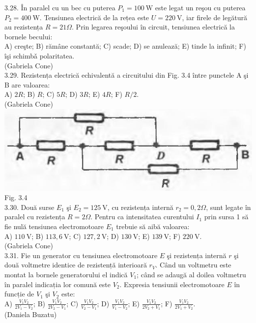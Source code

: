 \documentclass[10pt]{article}
\begin{document}
3.28. În paralel cu un bec cu puterea $P_{1}=100 \mathrm{~W}$ este legat un reşou cu puterea $P_{2}=400 \mathrm{~W}$. Tensiunea electrică de la rețea este $U=220 \mathrm{~V}$, iar firele de legătură au rezistența $R=21 \Omega$. Prin legarea reşoului în circuit, tensiunea electrică la bornele becului:\\ A) creşte; B) rămâne constantă; C) scade; D) se anulează; E) tinde la infinit; F) îşi schimbǎ polaritatea.\\ (Gabriela Cone)\\

3.29. Rezistența electrică echivalentă a circuitului din Fig. 3.4 între punctele A şi B are valoarea:\\ A) $2 R$; B) $R$; C) $5 R$; D) $3 R$; E) $4 R$; F) $R / 2$.\\ (Gabriela Cone)\\ \includegraphics[max width=\textwidth, center]{2025_07_01_5b3ff9fa0d508c8e9f17g-149} Fig. 3.4\\

3.30. Două surse $E_{1}$ şi $E_{2}=125 \mathrm{~V}$, cu rezistența internă $r_{2}=0,2 \Omega$, sunt legate în paralel cu rezistența $R=2 \Omega$. Pentru ca intensitatea curentului $I_{1}$ prin sursa 1 să fie nulă tensiunea electromotoare $E_{1}$ trebuie să aibă valoarea:\\ A) $110 \mathrm{~V}$; B) $113,6 \mathrm{~V}$; C) $127,2 \mathrm{~V}$; D) $130 \mathrm{~V}$; E) $139 \mathrm{~V}$; F) $220 \mathrm{~V}$.\\ (Gabriela Cone)\\

3.31. Fie un generator cu tensiunea electromotoare $E$ şi rezistența internă $r$ şi două voltmetre identice de rezistență interioară $r_{V}$. Când un voltmetru este montat la bornele generatorului el indică $V_{1}$; când se adaugă al doilea voltmetru în paralel indicația lor comună este $V_{2}$. Expresia tensiunii electromotoare $E$ în funcție de $V_{1}$ şi $V_{2}$ este:\\ A) $\frac{V_{1} V_{2}}{2 V_{1}-V_{2}}$; B) $\frac{V_{1} V_{2}}{2 V_{2}-V_{1}}$; C) $\frac{V_{1} V_{2}}{V_{2}-V_{1}}$; D) $\frac{V_{1} V_{2}}{V_{1}-V_{2}}$; E) $\frac{V_{1} V_{2}}{2 V_{2}+V_{1}}$; F) $\frac{V_{1} V_{2}}{2 V_{1}+V_{2}}$.\\ (Daniela Buzatu)\\
\end{document}
